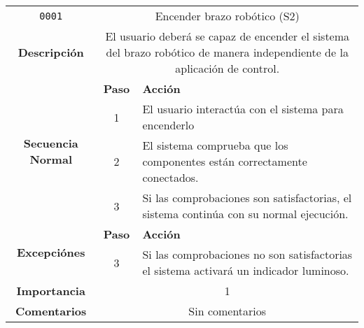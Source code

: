 \begin{table}[H]
    \centering
    \begin{tabularx}{\textwidth}{|c|c|X|}
        \cline{1-3}
        \texttt{0001}                              & \multicolumn{2}{c|}{Encender brazo robótico (S2)}                                                                                                                      \\ \cline{1-3}
        \textbf{Descripción}                       & \multicolumn{2}{m{13cm}|}{El usuario deberá se capaz de encender el sistema del brazo robótico de manera independiente de la aplicación de control.}
        \\ \cline{1-3}
        \multirow{4}{*}{\textbf{Secuencia Normal}} & \textbf{Paso}                                                                                                                                        & \textbf{Acción}
        \\ \cline{2-3}                    &   1  & El usuario interactúa con el sistema para encenderlo
        \\ \cline{2-3}                    &   2  & El sistema comprueba que los componentes están correctamente conectados.
        \\ \cline{2-3}                    &   3  & Si las comprobaciones son satisfactorias, el sistema continúa con su normal ejecución.
        \\ \cline{1-3}
        \multirow{2}{*}{\textbf{Excepciónes}}      & \textbf{Paso}                                                                                                                                        & \textbf{Acción}
        \\ \cline{2-3}                    &   3  & Si las comprobaciones no son satisfactorias el sistema activará un indicador luminoso.
        \\ \cline{1-3}
        \textbf{Importancia}                       & \multicolumn{2}{c|}{1}                                                                                                                                                 \\ \cline{1-3}
        \textbf{Comentarios}                       & \multicolumn{2}{c|}{Sin comentarios}                                                                                                                                   \\ \cline{1-3}
    \end{tabularx}
\end{table}